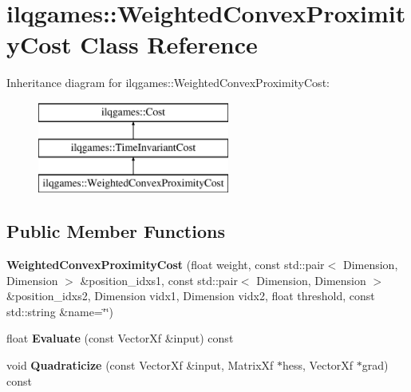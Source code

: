 \hypertarget{classilqgames_1_1_weighted_convex_proximity_cost}{}\section{ilqgames\+:\+:Weighted\+Convex\+Proximity\+Cost Class Reference}
\label{classilqgames_1_1_weighted_convex_proximity_cost}
Inheritance diagram for ilqgames\+:\+:Weighted\+Convex\+Proximity\+Cost\+:\begin{figure}[H]
\begin{center}
\leavevmode
\includegraphics[height=3.000000cm]{classilqgames_1_1_weighted_convex_proximity_cost}
\end{center}
\end{figure}
\subsection*{Public Member Functions}
\begin{DoxyCompactItemize}
\item 
{\bfseries Weighted\+Convex\+Proximity\+Cost} (float weight, const std\+::pair$<$ Dimension, Dimension $>$ \&position\+\_\+idxs1, const std\+::pair$<$ Dimension, Dimension $>$ \&position\+\_\+idxs2, Dimension vidx1, Dimension vidx2, float threshold, const std\+::string \&name=\char`\"{}\char`\"{})\hypertarget{classilqgames_1_1_weighted_convex_proximity_cost_a6833eb06aeaf101b1474d23fff00a2b9}{}\label{classilqgames_1_1_weighted_convex_proximity_cost_a6833eb06aeaf101b1474d23fff00a2b9}

\item 
float {\bfseries Evaluate} (const Vector\+Xf \&input) const \hypertarget{classilqgames_1_1_weighted_convex_proximity_cost_a55b07162c2cec9915842dbe558ebb772}{}\label{classilqgames_1_1_weighted_convex_proximity_cost_a55b07162c2cec9915842dbe558ebb772}

\item 
void {\bfseries Quadraticize} (const Vector\+Xf \&input, Matrix\+Xf $\ast$hess, Vector\+Xf $\ast$grad) const \hypertarget{classilqgames_1_1_weighted_convex_proximity_cost_ac360b44efdbe9d804ba61b237c363dad}{}\label{classilqgames_1_1_weighted_convex_proximity_cost_ac360b44efdbe9d804ba61b237c363dad}

\end{DoxyCompactItemize}
